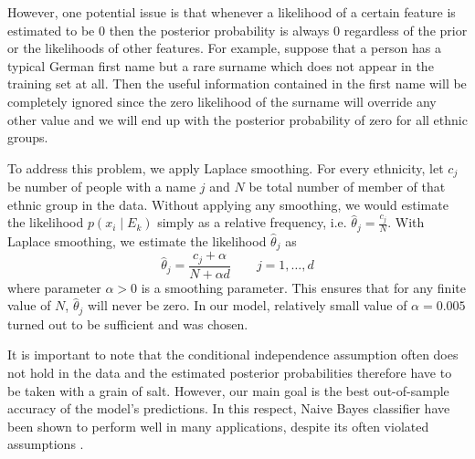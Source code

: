 However, one potential issue is that whenever a likelihood of a certain feature is estimated to be 0 then the posterior probability is always 0 regardless of the prior  or the likelihoods of other features. For example, suppose that a person has a typical German first name but a rare surname which does not appear in the training set at all. 
Then the useful information contained in the first name will be completely ignored since the zero likelihood of the surname will override any other value and we will end up with the posterior probability of zero for all ethnic groups.

To address this problem, we apply Laplace smoothing. 
For every ethnicity, let $c_j$ be number of people with a name $j$ and $N$ be total number of member of that ethnic group in the data.  Without applying any smoothing, we would estimate the likelihood  $p(x_i \mid E_k)$ simply as a relative frequency, i.e. $\hat\theta_j = \frac{c_j}{N}$. With  Laplace smoothing, we estimate  the  likelihood $\hat\theta_j$ as 
\begin{equation}
    \hat\theta_j = \frac{c_j + \alpha}{N + \alpha d} \qquad j = 1, \dots, d
\end{equation}
where parameter $\alpha > 0 $ is a smoothing parameter.  This ensures that for any finite value of $N$,  $\hat\theta_j$ will never be zero. %
In our model, relatively small value of  $\alpha = 0.005 $  turned out to be sufficient and  was chosen. 

It is important to note that the conditional independence assumption often does not hold in the data and the estimated posterior probabilities therefore have to be taken with a grain of salt. %
However, our main goal is the best out-of-sample accuracy of the model's predictions. In this respect, Naive Bayes classifier have been shown to perform  well in many applications, despite its often violated assumptions \citep{domingos_optimality_1997}.

